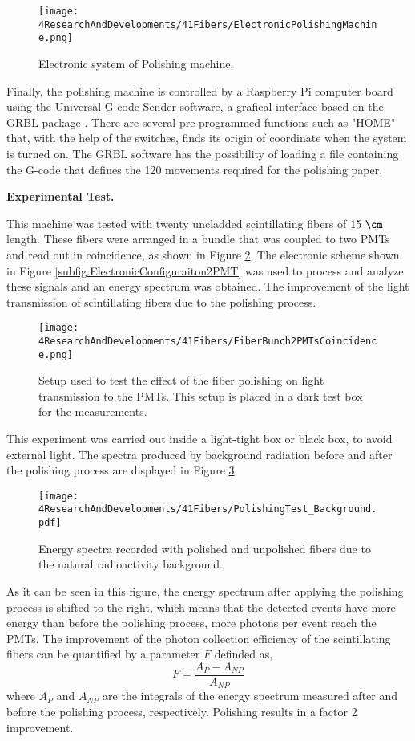 \begin{figure}[h]
\centering
\texttt{[image: 4ResearchAndDevelopments/41Fibers/ElectronicPolishingMachine.png]}
\caption{Electronic system of Polishing machine.\label{fig:ElectronicSystemPolishingMachine}}
\end{figure}

Finally, the polishing machine is controlled by a Raspberry Pi computer board \cite{RaspberryPi} using the Universal G-code Sender software, a grafical interface based on the GRBL package \cite{GRBLDocumentation}. There are several pre-programmed functions such as "HOME" that, with the help of the switches, finds its origin of coordinate when the system is turned on. The GRBL software has the possibility of loading a file containing the G-code that defines the 120 movements required for the polishing paper.

\textbf{Experimental Test.}

This machine was tested with twenty uncladded scintillating fibers of $15~\cm$ length. These fibers were arranged in a bundle that was coupled to two PMTs and read out in coincidence, as shown in Figure \ref{fig:BunchWith2PMTsCoincidence}. The electronic scheme shown in Figure \ref{subfig:ElectronicConfiguraiton2PMT} was used to process and analyze these signals and an energy spectrum was obtained. The improvement of the light transmission of scintillating fibers due to the polishing process.

\begin{figure}[]
\centering
\texttt{[image: 4ResearchAndDevelopments/41Fibers/FiberBunch2PMTsCoincidence.png]}
\caption{Setup used to test the effect of the fiber polishing on light transmission to the PMTs. This setup is placed in a dark test box for the measurements.\label{fig:BunchWith2PMTsCoincidence}}
\end{figure}

This experiment was carried out inside a light-tight box or black box, to avoid external light. The spectra produced by background radiation before and after the polishing process are displayed in Figure \ref{fig:ResultsOfPolishingMachineBackground}.
\begin{figure}[]
\centering
\texttt{[image: 4ResearchAndDevelopments/41Fibers/PolishingTest\_Background.pdf]}
\caption{Energy spectra recorded with polished and unpolished fibers due to the natural radioactivity background.\label{fig:ResultsOfPolishingMachineBackground}}
\end{figure}
As it can be seen in this figure, the energy spectrum after applying the polishing process is shifted to the right, which means that the detected events have more energy than before the polishing process, more photons per event reach the PMTs. The improvement of the photon collection efficiency of the scintillating fibers can be quantified by a parameter $F$ definded as,
\begin{equation}
F=\frac{A_{P}-A_{NP}}{A_{NP}}
\label{eq:RelativeImprovement}
\end{equation}
where $A_{P}$ and $A_{NP}$ are the integrals of the energy spectrum measured after and before the polishing process, respectively. Polishing results in a factor 2 improvement. 

